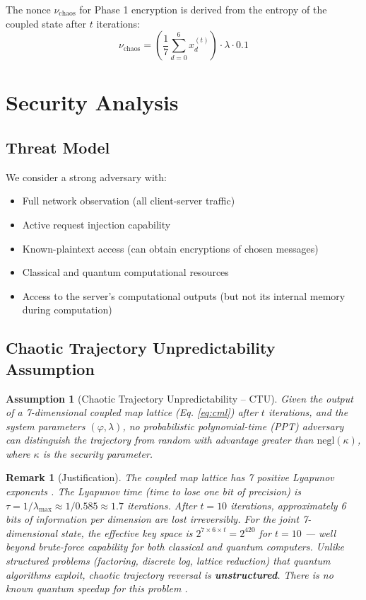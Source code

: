 \documentclass{article}
\newtheorem{remark}{Remark}[section]
\newtheorem{assumption}{Assumption}[section]
\begin{document}
The nonce $\nu_{\text{chaos}}$ for Phase 1 encryption is derived from the entropy of the coupled state after $t$ iterations:
\begin{equation}
\nu_{\text{chaos}} = \left( \frac{1}{7} \sum_{d=0}^{6} x_d^{(t)} \right) \cdot \lambda \cdot 0.1
\end{equation}

\section{Security Analysis}

\subsection{Threat Model}

We consider a strong adversary with:
\begin{itemize}
    \item Full network observation (all client-server traffic)
    \item Active request injection capability
    \item Known-plaintext access (can obtain encryptions of chosen messages)
    \item Classical and quantum computational resources
    \item Access to the server's computational outputs (but not its internal memory during computation)
\end{itemize}

\subsection{Chaotic Trajectory Unpredictability Assumption}

\begin{assumption}[Chaotic Trajectory Unpredictability -- CTU]
\label{assump:ctu}
Given the output of a 7-dimensional coupled map lattice (Eq. \ref{eq:cml}) after $t$ iterations, and the system parameters $(\varphi, \lambda)$, no probabilistic polynomial-time (PPT) adversary can distinguish the trajectory from random with advantage greater than $\text{negl}(\kappa)$, where $\kappa$ is the security parameter.
\end{assumption}

\begin{remark}[Justification]
The coupled map lattice has 7 positive Lyapunov exponents \cite{strogatz2018}. The Lyapunov time (time to lose one bit of precision) is $\tau = 1/\lambda_{\text{max}} \approx 1/0.585 \approx 1.7$ iterations. After $t = 10$ iterations, approximately 6 bits of information per dimension are lost irreversibly. For the joint 7-dimensional state, the effective key space is $2^{7 \times 6 \times t} = 2^{420}$ for $t = 10$ --- well beyond brute-force capability for both classical and quantum computers. Unlike structured problems (factoring, discrete log, lattice reduction) that quantum algorithms exploit, chaotic trajectory reversal is \textbf{unstructured}. There is no known quantum speedup for this problem \cite{shor1997}.
\end{remark}
\end{document}
